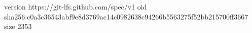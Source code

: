 version https://git-lfs.github.com/spec/v1
oid sha256:c0a3c36543abf9e8d3769ac14c0982638c94266b5563275f52bb215700ff3667
size 2353
